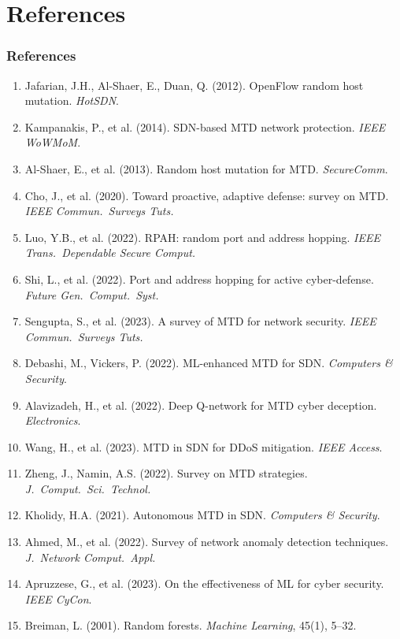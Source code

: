 \documentclass{beamer}
\begin{document}
\section{References}

\begin{frame}[allowframebreaks]
\frametitle{References}
\scriptsize
\begin{enumerate}
  \item Jafarian, J.H., Al-Shaer, E., Duan, Q. (2012). OpenFlow random host mutation. \textit{HotSDN}.
  \item Kampanakis, P., et al. (2014). SDN-based MTD network protection. \textit{IEEE WoWMoM}.
  \item Al-Shaer, E., et al. (2013). Random host mutation for MTD. \textit{SecureComm}.
  \item Cho, J., et al. (2020). Toward proactive, adaptive defense: survey on MTD. \textit{IEEE Commun.\ Surveys Tuts.}
  \item Luo, Y.B., et al. (2022). RPAH: random port and address hopping. \textit{IEEE Trans.\ Dependable Secure Comput.}
  \item Shi, L., et al. (2022). Port and address hopping for active cyber-defense. \textit{Future Gen.\ Comput.\ Syst.}
  \item Sengupta, S., et al. (2023). A survey of MTD for network security. \textit{IEEE Commun.\ Surveys Tuts.}
  \item Debashi, M., Vickers, P. (2022). ML-enhanced MTD for SDN. \textit{Computers \& Security}.
  \item Alavizadeh, H., et al. (2022). Deep Q-network for MTD cyber deception. \textit{Electronics}.
  \item Wang, H., et al. (2023). MTD in SDN for DDoS mitigation. \textit{IEEE Access}.
  \item Zheng, J., Namin, A.S. (2022). Survey on MTD strategies. \textit{J.\ Comput.\ Sci.\ Technol.}
  \item Kholidy, H.A. (2021). Autonomous MTD in SDN. \textit{Computers \& Security}.
  \item Ahmed, M., et al. (2022). Survey of network anomaly detection techniques. \textit{J.\ Network Comput.\ Appl.}
  \item Apruzzese, G., et al. (2023). On the effectiveness of ML for cyber security. \textit{IEEE CyCon}.
  \item Breiman, L. (2001). Random forests. \textit{Machine Learning}, 45(1), 5--32.

\end{enumerate}
\end{frame}
\end{document}
